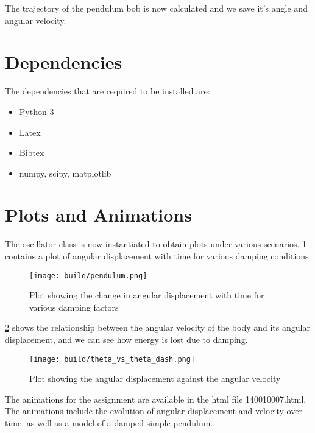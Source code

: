 \documentclass[12pt,english]{article}
\begin{document}
  The trajectory of the pendulum bob is now calculated and we save it's angle
  and angular velocity.

 \section{Dependencies}
   The dependencies that are required to be installed are:

   \begin{itemize}
     \item Python 3
     \item Latex
     \item Bibtex
     \item numpy, scipy, matplotlib
   \end{itemize}

\section{Plots and Animations}
  The oscillator class is now instantiated to obtain plots under various
  scenarios. \cref{fig:plot_pendulum} contains a plot of angular displacement with time for 
  various damping conditions
  \begin{figure}[h!]
    \centering
    \texttt{[image: build/pendulum.png]}
    \caption{Plot showing the change in angular displacement with time for various damping factors}
    \label{fig:plot_pendulum}
  \end{figure}

  
  \cref{fig:plot_theta_relation} shows the relationship between the angular velocity of the body and its
  angular displacement, and we can see how energy is lost due to damping.
  \begin{figure}[h!]
    \centering
    \texttt{[image: build/theta\_vs\_theta\_dash.png]}
    \caption{Plot showing the angular displacement against the angular velocity}
    \label{fig:plot_theta_relation}
  \end{figure}

  The animations for the assignment are available in the html file 140010007.html. 
  The animations include the evolution of angular displacement and velocity 
  over time, as well as a model of a damped simple pendulum. 
  
 

\printbibliography
\end{document}
